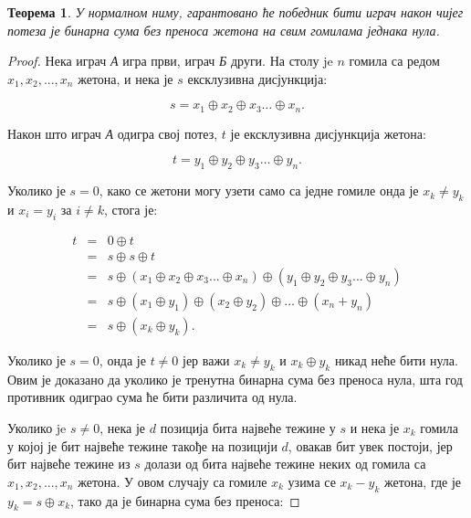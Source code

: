 \documentclass[a4paper]{article}
\newtheorem{theorem}{Теорема}
\begin{document}
\begin{theorem}
	\label{thm:pobeda}
	У нормалном ниму, гарантовано ће победник бити играч након чијег потеза је бинарна сума без преноса жетона на свим гомилама једнака нула.
\end{theorem}

\begin{proof}
	Нека играч \textit{А} игра први, играч \textit{Б} други. На столу je $ n $ гомила са редом $ x_{1}, x_{2}, ... , x_{n} $ жетона, и нека је $ s $ ексклузивна дисјункција: 
	
	\begin{displaymath}
		s = x_{1} \oplus x_{2} \oplus x_{3} \ldots \oplus x_{n}.
	\end{displaymath}
	
	Након што играч \textit{А} одигра свој потез, $ t $ је ексклузивна дисјункција жетона:
	
	\begin{displaymath}
		t = y_{1} \oplus y_{2} \oplus y_{3} \ldots \oplus y_{n}.
	\end{displaymath}
	
	 Уколико је $ s = 0 $, како се жетони могу узети само са једне гомиле онда је $ x_{k} \neq y_{k} $ и $ x_{i} = y_{i} $ за $ i \neq k $, стога је:
	 
	 \begin{eqnarray*}
	 	t &=& 0 \oplus t \\
		  &=& s \oplus s \oplus t \\
		  &=& s \oplus (x_{1} \oplus x_{2} \oplus x_{3} ... \oplus x_{n}) \oplus (y_{1} \oplus y_{2} \oplus y_{3} ... \oplus y_{n}) \\
		  &=& s \oplus (x_{1} \oplus y_{1}) \oplus (x_{2} \oplus y_{2}) \oplus  \ldots \oplus (x_{n} + y_{n}) \\
		  &=& s \oplus (x_{k} \oplus y_{k}). 		 
	 \end{eqnarray*}
	 
	 Уколико је $ s = 0 $, онда је $ t \neq 0 $ јер важи $ x_{k} \neq y_{k} $ и $ x_{k} \oplus y_{k} $ никад неће бити нула. Овим је доказано да уколико је тренутна бинарна сума без преноса нула, шта год противник одиграо сума ће бити различита од нула.
	 
	 Уколико je $ s \neq 0 $, нека је $ d $ позиција бита највеће тежине у $ s $ и нека је $ x_{k} $ гомила у којој је бит највеће тежине такође на позицији $ d $, овакав бит увек постоји, јер бит највеће тежине из $ s $ долази од бита највеће тежине неких од гомила са $ x_{1}, x_{2}, ... , x_{n} $ жетона. У овом случају са гомиле $ x_{k} $ узима се $ x_{k} - y_{k} $ жетона, где је $ y_{k} = s \oplus x_{k} $, тако да је бинарна сума без преноса:
	 

\end{proof}
\end{document}

